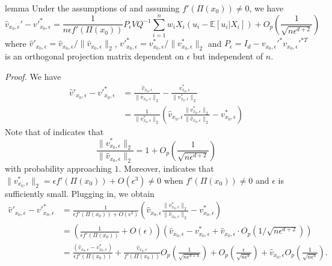 \documentclass[11pt]{article}
\begin{document}
\begin{restatable}{lemma}{} \label{lemma: norm velocity decomp}
    Under the assumptions of  and assuming $f'(\Pi(x_0)) \neq 0$, we have
    \begin{equation}
        \hat{v}_{x_0, \epsilon}' - v'^*_{x_0, \epsilon} = \frac{1}{n\epsilon f'(\Pi(x_0))}P_\epsilon VQ^{-1}\sum_{i = 1}^nw_iX_i(u_i - \mathbb{E}[u_i|X_i]) +O_p\left(\frac{1}{\sqrt{n\epsilon^{d+2}}}\right)
    \end{equation}
    where $\hat{v}'_{x_0, \epsilon} = \hat{v}_{x_0, \epsilon}/\|\hat{v}_{x_0, \epsilon}\|_2$, $v'^*_{x_0, \epsilon} = v^*_{x_0, \epsilon}/\|v^*_{x_0, \epsilon}\|_2$ and $P_\epsilon = I_d - v_{x_0, \epsilon}'^{*}v_{x_0, \epsilon}'^{*T}$ is an orthogonal projection matrix dependent on $\epsilon$ but independent of $n$.
\end{restatable}
\noindent \textit{Proof.}  We have
\begin{align*}
    \hat{v}'_{x_0, \epsilon} - v'^*_{x_0, \epsilon} &= \frac{\hat{v}_{x_0, \epsilon}}{\|\hat{v}_{x_0, \epsilon}\|_2} - \frac{v^*_{x_0, \epsilon}}{\|v^*_{x_0, \epsilon}\|_2} \\
    &= \frac{1}{\|v^*_{x_0, \epsilon}\|_2}\left(\hat{v}_{x_0, \epsilon}\frac{\|v^*_{x_0, \epsilon}\|_2}{\|\hat{v}_{x_0, \epsilon}\|_2} - v^*_{x_0, \epsilon}\right)
\end{align*}
Note that  of  indicates that 
\[\frac{\|v^*_{x_0, \epsilon}\|_2}{\|\hat{v}_{x_0, \epsilon}\|_2} = 1 + O_p\left(\frac{1}{\sqrt{n\epsilon^{d+2}}}\right)\]
with probability approaching $1$. Moreover,  indicates that $\|v^*_{x_0, \epsilon}\|_2 = \epsilon f'(\Pi(x_0))+ O(\epsilon^3) \neq 0$ when $f'(\Pi(x_0)) \neq 0$ and $\epsilon$ is sufficiently small. Plugging in, we obtain
\begin{align*}
    \hat{v}'_{x_0, \epsilon} - v'^*_{x_0, \epsilon} &=\frac{1}{\epsilon f'(\Pi(x_0)) + O(\epsilon^3)}\left(\hat{v}_{x_0, \epsilon}\frac{\|v^*_{x_0, \epsilon}\|_2}{\|\hat{v}_{x_0, \epsilon}\|_2} - v^*_{x_0, \epsilon}\right) \\
    &= \left(\frac{1}{\epsilon f'(\Pi(x_0))}  + O(\epsilon)\right)\left(\hat{v}_{x_0, \epsilon} - v^*_{x_0, \epsilon} + \hat{v}_{x_0, \epsilon}\cdot O_p(1/\sqrt{n\epsilon^{d+2}})\right) \\
    &= \frac{(\hat{v}_{x_0, \epsilon} - v^*_{x_0, \epsilon})}{\epsilon f'(\Pi(x_0))} + \frac{\hat{v}_{x_0, \epsilon}}{f'(\Pi(x_0))}O_p\left(\frac{1}{\sqrt{n\epsilon^{d+4}}}\right) + O_p\left(\frac{\epsilon}{\sqrt{n\epsilon^{d}}}\right) +\hat{v}_{x_0, \epsilon}O_p\left(\frac{1}{\sqrt{n\epsilon^{d}}}\right).
\end{align*}
\end{document}

